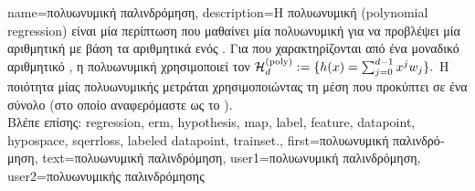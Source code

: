 {name={\foreignlanguage{greek}{πολυωνυμική παλινδρόμηση}}, 
	description={\foreignlanguage{greek}{Η πολυωνυμική} 
		 (polynomial regression) \foreignlanguage{greek}{είναι μία περίπτωση}  \foreignlanguage{greek}{που 
		μαθαίνει μία πολυωνυμική}   \foreignlanguage{greek}{για να προβλέψει μία αριθμητική} 
		 \foreignlanguage{greek}{με βάση τα αριθμητικά}  \foreignlanguage{greek}{ενός} 
		. \foreignlanguage{greek}{Για}  \foreignlanguage{greek}{που 
		χαρακτηρίζονται από ένα μοναδικό αριθμητικό} , 
		\foreignlanguage{greek}{η πολυωνυμική}  \foreignlanguage{greek}{χρησιμοποιεί τον}  
		$\mathcal{H}^{(\rm poly)}_{d} := \{ h(x) = \sum_{j=0}^{d-1} x^{j} w_{j} \}.$
		\foreignlanguage{greek}{Η ποιότητα μίας πολυωνυμικής}   \foreignlanguage{greek}{μετράται 
		χρησιμοποιώντας τη μέση}  \foreignlanguage{greek}{που προκύπτει σε ένα σύνολο} 
		 (\foreignlanguage{greek}{στο οποίο αναφερόμαστε ως το} ).
		\\
		\foreignlanguage{greek}{Βλέπε επίσης:} \gls{regression}, \gls{erm}, \gls{hypothesis}, \gls{map}, \gls{label}, \gls{feature}, \gls{datapoint}, 
		\gls{hypospace}, \gls{sqerrloss}, \gls{labeled datapoint}, \gls{trainset}.},
	first={\foreignlanguage{greek}{πολυωνυμική παλινδρόμηση}},
	text={\foreignlanguage{greek}{πολυωνυμική παλινδρόμηση}},
	user1={\foreignlanguage{greek}{πολυωνυμική παλινδρόμηση}}, %
	user2={\foreignlanguage{greek}{πολυωνυμικής παλινδρόμησης}} %
}

